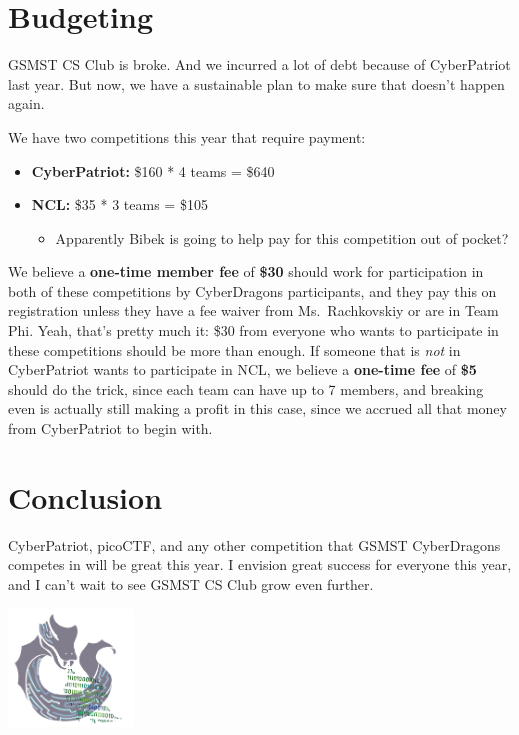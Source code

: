 \documentclass[
  letterpaper,
  DIV=11,
  numbers=noendperiod]{scrartcl}
\providecommand{\tightlist}{%
  \setlength{\itemsep}{0pt}\setlength{\parskip}{0pt}}\usepackage{longtable,booktabs,array}
\begin{document}
\hypertarget{budgeting}{%
\section{Budgeting}\label{budgeting}}

GSMST CS Club is broke. And we incurred a lot of debt because of
CyberPatriot last year. But now, we have a sustainable plan to make sure
that doesn't happen again.

We have two competitions this year that require payment:

\begin{itemize}
\tightlist
\item
  \textbf{CyberPatriot:} \$160 * 4 teams = \$640
\item
  \textbf{NCL:} \$35 * 3 teams = \$105

  \begin{itemize}
  \tightlist
  \item
    Apparently Bibek is going to help pay for this competition out of
    pocket?
  \end{itemize}
\end{itemize}

We believe a \textbf{one-time member fee} of \textbf{\$30} should work
for participation in both of these competitions by CyberDragons
participants, and they pay this on registration unless they have a fee
waiver from Ms.~Rachkovskiy or are in Team Phi. Yeah, that's pretty much
it: \$30 from everyone who wants to participate in these competitions
should be more than enough. If someone that is \emph{not} in
CyberPatriot wants to participate in NCL, we believe a \textbf{one-time
fee} of \textbf{\$5} should do the trick, since each team can have up to
7 members, and breaking even is actually still making a profit in this
case, since we accrued all that money from CyberPatriot to begin with.

\hypertarget{conclusion}{%
\section{Conclusion}\label{conclusion}}

CyberPatriot, picoCTF, and any other competition that GSMST CyberDragons
competes in will be great this year. I envision great success for
everyone this year, and I can't wait to see GSMST CS Club grow even
further.

\includegraphics[width=0.25\textwidth,height=\textheight]{csclublogo.png}
\end{document}
